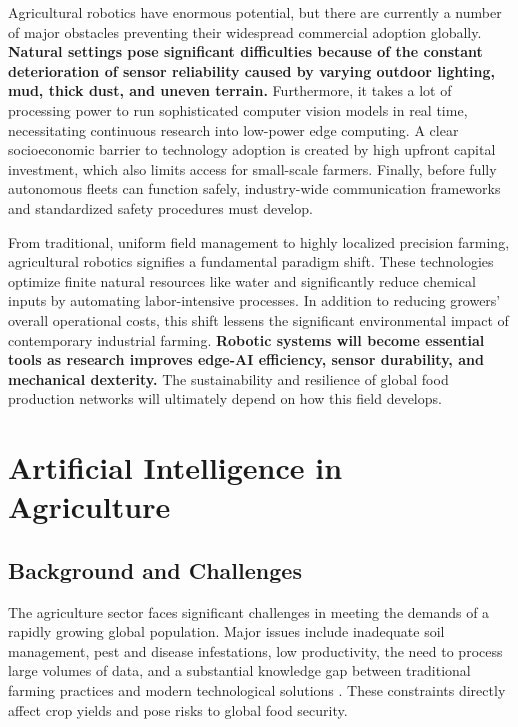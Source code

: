 Agricultural robotics have enormous potential, but there are currently a number of major obstacles preventing their widespread commercial adoption globally.\textbf{ Natural settings pose significant difficulties because of the constant deterioration of sensor reliability caused by varying outdoor lighting, mud, thick dust, and uneven terrain.} Furthermore, it takes a lot of processing power to run sophisticated computer vision models in real time, necessitating continuous research into low-power edge computing. A clear socioeconomic barrier to technology adoption is created by high upfront capital investment, which also limits access for small-scale farmers. Finally, before fully autonomous fleets can function safely, industry-wide communication frameworks and standardized safety procedures must develop.\cite{SCPE:Hassan:2017:IPA}

From traditional, uniform field management to highly localized precision farming, agricultural robotics signifies a fundamental paradigm shift. These technologies optimize finite natural resources like water and significantly reduce chemical inputs by automating labor-intensive processes. In addition to reducing growers' overall operational costs, this shift lessens the significant environmental impact of contemporary industrial farming. \textbf{Robotic systems will become essential tools as research improves edge-AI efficiency, sensor durability, and mechanical dexterity.} The sustainability and resilience of global food production networks will ultimately depend on how this field develops.\citep{premier2026aidriven}

\section{Artificial Intelligence in Agriculture}

\subsection{Background and Challenges}

The agriculture sector faces significant challenges in meeting the demands of a rapidly growing global population. Major issues include inadequate soil management, pest and disease infestations, low productivity, the need to process large volumes of data, and a substantial knowledge gap between traditional farming practices and modern technological solutions \cite{FAO2021, Wolfert2017}. These constraints directly affect crop yields and pose risks to global food security.

